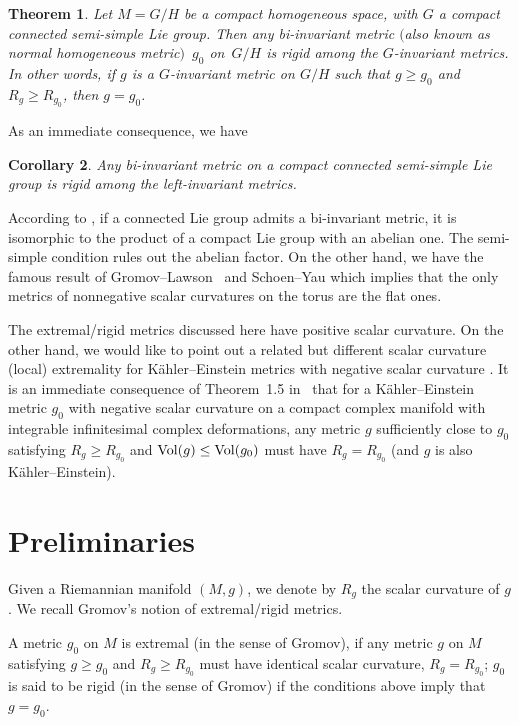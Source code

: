 \documentclass[10pt,a4paper]{amsart}
\newtheorem{Theorem}{Theorem}
\newtheorem{Corollary}[Theorem]{Corollary}
\begin{document}
\begin{Theorem}\label{main theorem}	Let $M=G/H$ be a compact homogeneous space, with $G$ a compact connected semi-simple Lie group. Then any bi-invariant metric $($also known as normal homogeneous metric$)$~$g_0$ on~$G/H$ is rigid among the $G$-invariant metrics. In other words, if $g$ is a $G$-invariant metric on $G/H$ such that $g\geq g_0$ and $R_g\geq R_{g_0}$, then $g=g_0$.
\end{Theorem}


As an immediate consequence, we have
\begin{Corollary}\label{corollary1}
	Any bi-invariant metric on a compact connected semi-simple Lie group is rigid among the left-invariant metrics.
\end{Corollary}

According to \cite{1}, if a connected Lie group admits a bi-invariant metric, it is isomorphic to the product of a compact Lie group with an abelian one. The semi-simple condition rules out the abelian factor. On the other hand, we have the famous result of Gromov--Lawson~\cite{9} and Schoen--Yau \cite{10, 11} which implies that the only metrics of nonnegative scalar curvatures on the torus are the flat ones.
\begin{Remark}
 The extremal/rigid metrics discussed here have positive scalar curvature. On the other hand, we would like to point out a related but different scalar curvature (local) extremality for K\"ahler--Einstein metrics with negative scalar curvature \cite{15}. It is an immediate consequence of Theorem~1.5 in~\cite{15} that for a K\"ahler--Einstein metric $g_0$ with negative scalar curvature on a compact complex manifold with integrable infinitesimal complex deformations, any metric $g$ sufficiently close to $g_0$ satisfying $R_g\geq R_{g_0}$ and ${\rm Vol}(g) \leq {\rm Vol}(g_0)$ must have $R_g = R_{g_0}$ (and $g$ is also K\"ahler--Einstein).
\end{Remark}

\section{Preliminaries}

Given a Riemannian manifold $(M,g)$, we denote by $R_g$ the scalar curvature of $g$.
We recall Gromov's notion of extremal/rigid metrics.
\begin{Definition}
	A metric $g_0$ on $M$ is extremal (in the sense of Gromov), if any metric $g$ on $M$ satisfying $g\geq g_0$ and $R_{g}\geq R_{g_0}$ must have identical scalar curvature, $R_g=R_{g_0}$; $g_0$ is said to be rigid (in the sense of Gromov) if the conditions above imply that $g=g_0$.
\end{Definition}
\end{document}
